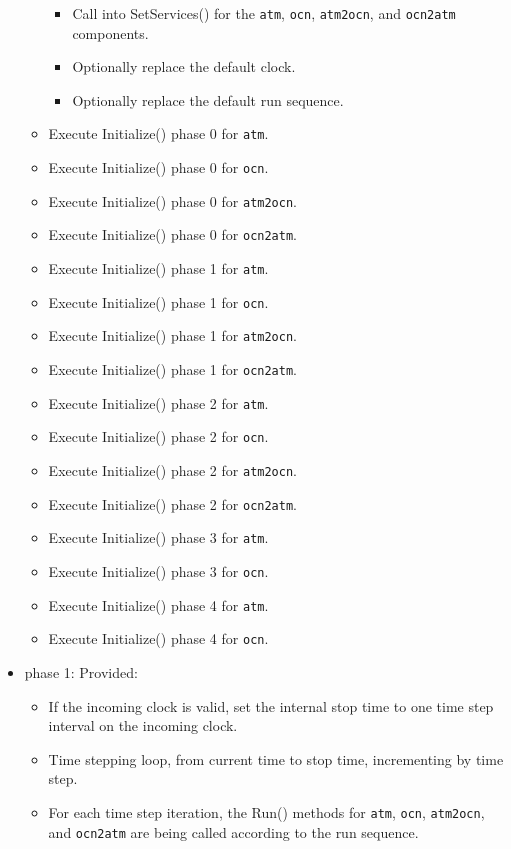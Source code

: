 \begin{itemize}
\begin{itemize}
  \begin{itemize}
    \item Call into SetServices() for the {\tt atm}, {\tt ocn}, {\tt atm2ocn}, and {\tt ocn2atm} components.
    \item Optionally replace the default clock. 
    \item Optionally replace the default run sequence.
  \end{itemize}
  \item Execute Initialize() phase 0 for {\tt atm}.
  \item Execute Initialize() phase 0 for {\tt ocn}.
  \item Execute Initialize() phase 0 for {\tt atm2ocn}.
  \item Execute Initialize() phase 0 for {\tt ocn2atm}.
  \item Execute Initialize() phase 1 for {\tt atm}.
  \item Execute Initialize() phase 1 for {\tt ocn}.
  \item Execute Initialize() phase 1 for {\tt atm2ocn}.
  \item Execute Initialize() phase 1 for {\tt ocn2atm}.
  \item Execute Initialize() phase 2 for {\tt atm}.
  \item Execute Initialize() phase 2 for {\tt ocn}.
  \item Execute Initialize() phase 2 for {\tt atm2ocn}.
  \item Execute Initialize() phase 2 for {\tt ocn2atm}.
  \item Execute Initialize() phase 3 for {\tt atm}.
  \item Execute Initialize() phase 3 for {\tt ocn}.
  \item Execute Initialize() phase 4 for {\tt atm}.
  \item Execute Initialize() phase 4 for {\tt ocn}.
  \end{itemize}  
\end{itemize}

\begin{itemize}
\item phase 1: {\sc Provided:}
  \begin{itemize}
  \item If the incoming clock is valid, set the internal stop time to one time step interval on the incoming clock.
  \item Time stepping loop, from current time to stop time, incrementing by time step.
  \item For each time step iteration, the Run() methods for {\tt atm}, {\tt ocn}, {\tt atm2ocn}, and {\tt ocn2atm} are being called according to the run sequence.
  \end{itemize}    
\end{itemize}

